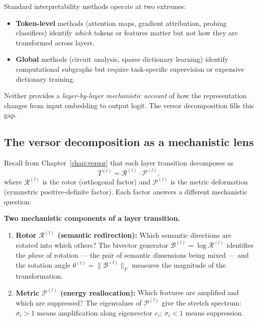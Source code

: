 \documentclass[11pt, twoside, openright]{memoir}
\newcommand{\rotor}[1]{\mathcal{R}^{(#1)}}  %
\newcommand{\bivec}[1]{\mathcal{B}^{(#1)}}  %
\newcommand{\metric}[1]{\mathcal{P}^{(#1)}} %
\numberwithin{equation}{chapter}
\begin{document}
Standard interpretability methods operate at two extremes:
\begin{itemize}[nosep]
\item \textbf{Token-level} methods (attention maps, gradient
  attribution, probing classifiers) identify \emph{which} tokens or
  features matter but not how they are transformed across layers.
\item \textbf{Global} methods (circuit analysis, sparse dictionary
  learning) identify computational subgraphs but require
  task-specific supervision or expensive dictionary training.
\end{itemize}
Neither provides a \emph{layer-by-layer mechanistic account} of how
the representation changes from input embedding to output logit.
The versor decomposition fills this gap.

\subsection{The versor decomposition as a mechanistic lens}

Recall from Chapter~\ref{chap:versor} that each layer transition
decomposes as
\begin{equation}
  T^{(l)} = \rotor{l} \cdot \metric{l},
\end{equation}
where $\rotor{l}$ is the rotor (orthogonal factor) and $\metric{l}$ is
the metric deformation (symmetric positive-definite factor).  Each
factor answers a different mechanistic question:

\begin{gabox}
\textbf{Two mechanistic components of a layer transition.}
\begin{enumerate}[nosep]
\item \textbf{Rotor $\rotor{l}$ (semantic redirection):} Which
  semantic directions are rotated into which others?  The bivector
  generator $\bivec{l} = \log \rotor{l}$ identifies the \emph{plane} of
  rotation --- the pair of semantic dimensions being mixed --- and the
  rotation angle $\theta^{(l)} = \|\bivec{l}\|_F$ measures the magnitude
  of the transformation.
\item \textbf{Metric $\metric{l}$ (energy reallocation):}  Which
  features are amplified and which are suppressed?  The eigenvalues of
  $\metric{l}$ give the stretch spectrum: $\sigma_i > 1$ means
  amplification along eigenvector $e_i$; $\sigma_i < 1$ means
  suppression.
\end{enumerate}
\end{gabox}
\end{document}
